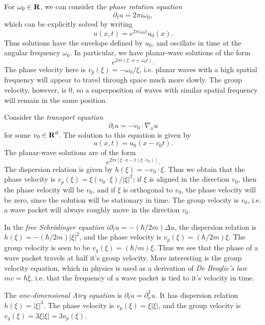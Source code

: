 \begin{example}
	For $\omega_0 \in \operatorname{\mathbf{R}}$, we can consider the \emph{phase rotation equation}
	\[ \partial_t u = 2 \pi i \omega_0, \]
	which can be explicitly solved by writing
	\[ u(x,t) = e^{2 \pi i \omega_0 t} u_0(x). \]
	Thus solutions have the envelope defined by $u_0$, and oscillate in time at the angular frequency $\omega_0$. In particular, we have planar-wave solutions of the form
	\[ e^{2 \pi i (\xi \cdot x + \omega_0 t)}. \]
	The phase velocity here is $v_p(\xi) = - \omega_0 / \xi$, i.e. planar waves with a high spatial frequency will appear to travel through space much more slowly. The group velocity, however, is $0$, so a superposition of waves with similar spatial frequency will remain in the same position.
\end{example}

\begin{example}
	Consider the \emph{transport equation}
	\[ \partial_t u = - v_0 \cdot \nabla_x u \]
	for some $v_0 \in \operatorname{\mathbf{R}}^d$. The solution to this equation is given by
	\[ u(x,t) = u_0(x - v_0 t). \]
	The planar-wave solutions are of the form
	\[ e^{2 \pi i [\xi \cdot x - t (\xi \cdot v_0)]}. \]
	The dispersion relation is given by $h(\xi) = - v_0 \cdot \xi$. Thus we obtain that the phase velocity is $v_p(\xi) = \xi (v_0 \cdot \xi) / |\xi|^2$; if $\xi$ is aligned in the direction $v_0$, then the phase velocity will be $v_0$, and if $\xi$ is orthogonal to $v_0$, the phase velocity will be zero, since the solution will be stationary in time. The group velocity is $v_0$, i.e. a wave packet will always roughly move in the direction $v_0$.
\end{example}

\begin{example}
	In the \emph{free Schr\"{o}dinger equation} $i \partial_t u = - (\hbar / 2 m) \Delta u$, the dispersion relation is $h(\xi) = - (\hbar / 2 m) |\xi|^2$, and the phase velocity is $v_p(\xi) = (\hbar / 2 m) \xi$. The group velocity is seen to be $v_g(\xi) = (\hbar / m) \xi$. Thus we see that the phase of a wave packet travels at half it's group velocity. More interesting is the group velocity equation, which in physics is used as a derivation of \emph{De Broglie's law} $mv = \hbar \xi$, i.e. that the frequency of a wave packet is tied to it's velocity in time.
\end{example}

\begin{example}
	The \emph{one-dimensional Airy equation} is $\partial_t u = \partial_x^3 u$. It has dispersion relation $h(\xi) = |\xi|^3$. The phase velocity is $v_p(\xi) = \xi |\xi|$, and the group velocity is $v_g(\xi) = 3 \xi |\xi| = 3 v_p(\xi)$.
\end{example}

